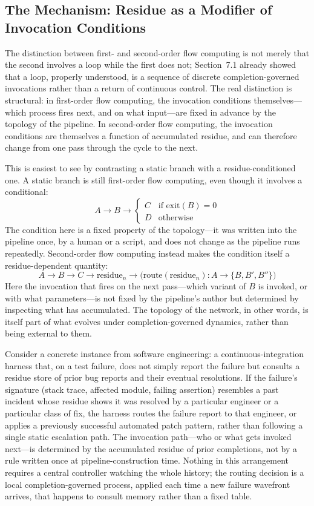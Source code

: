 \documentclass[12pt, a4paper]{article}
\begin{document}
\subsection{The Mechanism: Residue as a Modifier of Invocation
Conditions}

The distinction between first- and second-order flow computing is
not merely that the second involves a loop while the first does
not; Section~7.1 already showed that a loop, properly understood,
is a sequence of discrete completion-governed invocations rather
than a return of continuous control. The real distinction is
structural: in first-order flow computing, the invocation
conditions themselves---which process fires next, and on what
input---are fixed in advance by the topology of the pipeline. In
second-order flow computing, the invocation conditions are
themselves a function of accumulated residue, and can therefore
change from one pass through the cycle to the next.

This is easiest to see by contrasting a static branch with a
residue-conditioned one. A static branch is still first-order flow
computing, even though it involves a conditional:
\[
A \to B \to
\begin{cases}
C & \text{if exit}(B) = 0 \\
D & \text{otherwise}
\end{cases}
\]
The condition here is a fixed property of the topology---it was
written into the pipeline once, by a human or a script, and does
not change as the pipeline runs repeatedly. Second-order flow
computing instead makes the condition itself a residue-dependent
quantity:
\[
A \to B \to C \to \text{residue}_n \to \big(\text{route}(\text{residue}_n) : A \to \{B, B', B''\}\big)
\]
Here the invocation that fires on the next pass---which variant of
$B$ is invoked, or with what parameters---is not fixed by the
pipeline's author but determined by inspecting what has
accumulated. The topology of the network, in other words, is
itself part of what evolves under completion-governed dynamics,
rather than being external to them.

Consider a concrete instance from software engineering: a
continuous-integration harness that, on a test failure, does not
simply report the failure but consults a residue store of prior
bug reports and their eventual resolutions. If the failure's
signature (stack trace, affected module, failing assertion)
resembles a past incident whose residue shows it was resolved by
a particular engineer or a particular class of fix, the harness
routes the failure report to that engineer, or applies a
previously successful automated patch pattern, rather than
following a single static escalation path. The invocation
path---who or what gets invoked next---is determined by the
accumulated residue of prior completions, not by a rule written
once at pipeline-construction time. Nothing in this arrangement
requires a central controller watching the whole history; the
routing decision is a local completion-governed process, applied
each time a new failure wavefront arrives, that happens to consult
memory rather than a fixed table.
\end{document}
